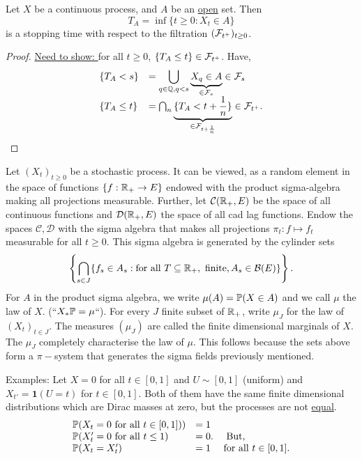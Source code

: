 \documentclass{article}
\begin{document}
\begin{boxprop}\label{prop: open set stopping time wrt future filtration}
	Let $ X$ be a continuous process, and $ A$ be an \underline{open} set. Then 
	\[
		T_{A} = \displaystyle\inf\{t\geq 0: X_{t}\in A\}
	\]
	is a stopping time with respect to the filtration $ (\mathcal{F}_{t^{+}})_{t\geq 0}$.
\end{boxprop}


\begin{proof}
	\underline{Need to show: } for all $ t\geq 0$, $ \{T_{A}\leq t\}\in \mathcal{F}_{t^{+}}$. Have, 
\[
\begin{array}{ll}
	\{T_{A}<s\} &= \displaystyle\bigcup_{q\in \mathbb{Q}, q<s}\displaystyle\underbrace{X_{q}\in A}_{\in \mathcal{F}_{s}}\in \mathcal{F}_{s}  \\
	\{T_{A}\leq t\} &= \bigcap_{n}\displaystyle\underbrace{\{T_{A}<t+\frac{1}{n}\}}_{\in \mathcal{F}_{t+\frac{1}{n}}} \in \mathcal{F}_{t^{+}}.
\end{array}
\]
\end{proof}
Let $ (X_{t})_{t\geq 0}
$ be a stochastic process. It can be viewed, as a random element in the space of functions $ \{f:\mathbb{R}_{+}\to E\}$ endowed with the product sigma-algebra making all projections measurable. Further, let $ \mathcal{C}(\mathbb{R}_{+}, E)$ be the space of all continuous functions and $ \mathcal{D}(\mathbb{R}_{+}, E)$ the space of all cad lag functions. Endow the spaces $ \mathcal{C}, \mathcal{D}$ with the sigma algebra that makes all projections $ \pi_{t}: f\mapsto f_{t}$ measurable for all $ t\geq 0$. This sigma algebra is generated by the cylinder sets 
\[
	\left\{ \displaystyle\bigcap_{s\in J} \{f_{s}\in A_{s}: \text{for all } T\subseteq \mathbb{R}_{+}, \text{ finite}, A_{s}\in \mathcal{B}(E)\} \right\}.
\]
For $ A$ in the product sigma algebra, we write $ \mu(A) = \mathbb{P}(X\in A)$ and we call $ \mu$ the law of $ X$. (``$ X_{*}\mathbb{P} = \mu$``). For every $ J$ finite subset of $ \mathbb{R}_{+}$, write $ \mu_{J}$ for the law of $ (X_{t})_{t\in J}$. The measures $ (\mu_{J})$ are called the finite dimensional marginals of $ X$. The $ \mu_{J}$ completely characterise the law of $ \mu$. This follows because the sets above form a $\pi-$system that generates the sigma fields previously mentioned.


\begin{examplesblock}{Examples: }\label{examples: 6}
	Let $ X = 0$ for all $ t\in [0,1]$ and $ U\sim [0,1]$ (uniform) and $ X_{t'} = \mathbf{1}(U = t)$ for $ t\in [0,1]$. Both of them have the same finite dimensional distributions which are Dirac masses at zero, but the processes are not \underline{equal}. 
	\[
	\begin{array}{ll}
		\mathbb{P}(X_{t} = 0 \text{ for all } t\in [0,1])) &= 1 \\
							   \mathbb{P}(X'_{t} = 0 \text{ for all } t\leq 1) &= 0. \quad \text{ But, }\\ 
 \mathbb{P}(X_{t } = X'_{t}) &= 1 \quad \text{ for all } t\in [0,1]. 
	\end{array}
	\]
\end{examplesblock}
\end{document}
